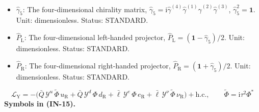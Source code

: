 \documentclass[
  10pt,
]{article}
\begin{document}
\begin{itemize}
\item
  \(\hat\gamma_5\): The four-dimensional chirality matrix,
  \(\hat\gamma_5 = \mathrm{i}\hat\gamma^{(4)}\hat\gamma^{(1)}\hat\gamma^{(2)}\hat\gamma^{(3)}\),
  \(\hat\gamma_5^2 = \mathbf{1}\). Unit: dimensionless. Status:
  STANDARD.
\item
  \(\hat P_{\mathrm{L}}\): The four-dimensional left-handed projector,
  \(\hat P_{\mathrm{L}} = (\mathbf{1} - \hat\gamma_5)/2\). Unit:
  dimensionless. Status: STANDARD.
\item
  \(\hat P_{\mathrm{R}}\): The four-dimensional right-handed projector,
  \(\hat P_{\mathrm{R}} = (\mathbf{1} + \hat\gamma_5)/2\). Unit:
  dimensionless. Status: STANDARD.
\end{itemize}

\[
\mathcal{L}_{\mathrm{Y}} = -\big(\bar Q\,\mathcal{Y}^{u}\,\tilde\Phi\,u_{\mathrm{R}} + \bar Q\,\mathcal{Y}^{d}\,\Phi\,d_{\mathrm{R}}
 + \bar\ell\,\mathcal{Y}^{e}\,\Phi\,e_{\mathrm{R}} + \bar\ell\,\mathcal{Y}^{\nu}\,\tilde\Phi\,\nu_{\mathrm{R}}\big)
 + \mathrm{h.c.},\qquad \tilde\Phi = \mathrm{i}\tau^2\Phi^* \tag{IN-15}
\] \textbf{Symbols in (IN-15).}
\end{document}
